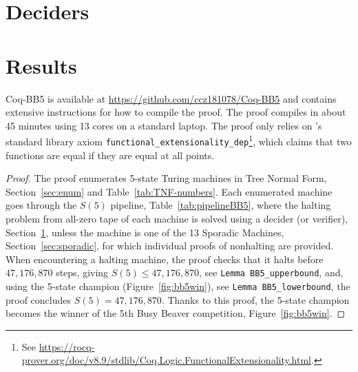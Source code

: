 \documentclass[a4paper,british]{article}
\theoremstyle{definition} %
\numberwithin{equation}{section}
\theoremstyle{definition} %
\newcommand{\numSporadic}{13\xspace}
\newcommand{\CoqBB}{Coq-BB5\xspace}
\begin{document}


\newpage



\section{Deciders}\label{sec:deciders}








\newpage




\newpage


\newpage
\section{Results}\label{sec:results}

\CoqBB is available at \url{https://github.com/ccz181078/Coq-BB5} \cite{mxdys_2025_17061968} and contains extensive instructions for how to compile the proof. The proof compiles in about 45 minutes using 13 cores on a standard laptop. The proof only relies on \Coq's standard library axiom \texttt{functional\_extensionality\_dep}\footnote{See \url{https://rocq-prover.org/doc/v8.9/stdlib/Coq.Logic.FunctionalExtensionality.html}.}, which claims that two functions are equal if they are equal at all points.

\thBBTheFifth*
\begin{proof}
    The \Coq proof enumerates 5-state Turing machines in Tree Normal Form, Section~\ref{sec:enum} and Table~\ref{tab:TNF-numbers}. Each enumerated machine goes through the $S(5)$ pipeline, Table~\ref{tab:pipelineBB5}, where the halting problem from all-zero tape of each machine is solved using a decider (or verifier), Section~\ref{sec:deciders}, unless the machine is one of the \numSporadic Sporadic Machines, Section~\ref{sec:sporadic}, for which individual \Coq proofs of nonhalting are provided.
    When encountering a halting machine, the proof checks that it halts before $47{,}176{,}870$ steps, giving $S(5) \leq 47{,}176{,}870$, see \texttt{Lemma BB5\_upperbound}, and, using the 5-state champion (Figure~\ref{fig:bb5win}), see \texttt{Lemma BB5\_lowerbound}, the proof concludes $S(5) = 47{,}176{,}870$. Thanks to this proof, the 5-state champion becomes the winner of the 5th Busy Beaver competition, Figure~\ref{fig:bb5win}.
\end{proof}
\end{document}
